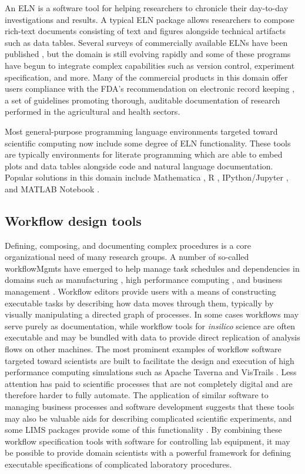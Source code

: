 \documentclass[../thesis]{subfiles}
\begin{document}
An \gls{ELN} is a software tool for helping
researchers to chronicle their day-to-day investigations and
results. A typical \gls{ELN} package allows researchers to compose
rich-text documents consisting of text and figures alongside technical
artifacts such as data tables. Several surveys of
commercially available ELNs have been published
\cite{Rubacha2011, Dirnagl2016}, but the domain is still evolving
rapidly and some of these programs have begun to integrate complex
capabilities such as version control, experiment specification, and
more. Many of the commercial products in this domain
offer users compliance with the FDA's recommendation on electronic
record keeping \cite{FDA}, a set of guidelines promoting thorough,
auditable documentation of research performed in the agricultural and
health sectors.

Most general-purpose programming language environments targeted toward
scientific computing now include some degree of ELN
functionality. These tools are typically environments for literate
programming \cite{Knuth:1984:LP:473.479} which are able to embed plots
and data tables alongside code and natural language
documentation. Popular solutions in this domain include Mathematica
\cite{mathematica}, R \cite{Rlang}, IPython/Jupyter \cite{IPython},
and MATLAB Notebook \cite{MATLAB}.




\subsection{Workflow design tools}

Defining, composing, and documenting complex procedures is a core
organizational need of many research groups. A number of so-called
\glspl{workflowMgmt} have emerged to help manage task schedules and
dependencies in domains such as manufacturing
\cite{Allweyer:2010:BPM:1841147}, high performance computing
\cite{VisTrails}, and business management
\cite{cardoso2004workflow}. Workflow editors provide users with a
means of constructing executable tasks by describing how
data moves through them, typically by visually manipulating a directed
graph of processes. In some cases workflows may serve purely as
documentation, while workflow tools for \textit{\gls{insilico}} science
are often executable and may be bundled with data to provide direct
replication of analysis flows on other machines. The most prominent
examples of workflow software
targeted toward scientists are built to facilitate the design and
execution of high performance computing simulations such as Apache
Taverna \cite{Taverna} and VisTrails \cite{VisTrails}. Less
attention has paid to scientific processes that are not completely digital
and are therefore harder to fully automate. The application
of similar software to managing business processes and software
development suggests that these tools may also be valuable aids for
describing complicated scientific experiments, and some \gls{LIMS} packages
provide some of this functionality \cite{CoreLIMS}. By combining these
workflow specification tools with software for controlling lab
equipment, it may be possible to provide domain scientists with a
powerful framework for defining executable specifications of
complicated laboratory procedures.
\end{document}
